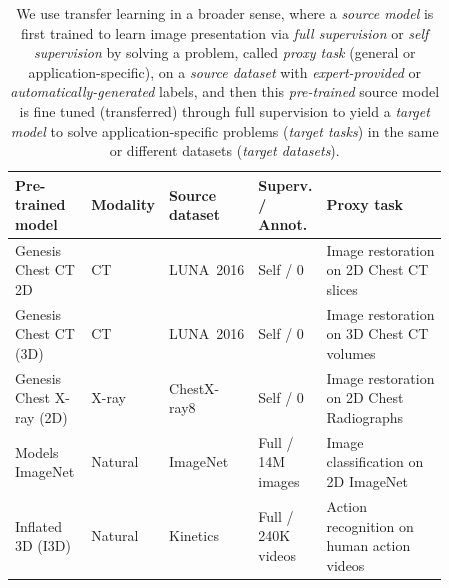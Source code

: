 
\begin{table}
\begin{threeparttable}[t]
\begin{center}
\footnotesize
\caption[Definition of Pre-trained Models, Proxy and Target Tasks]{
We use transfer learning in a broader sense, where a \textit{source model} is first trained to learn image presentation via \textit{full supervision} or \textit{self supervision} by solving a problem, called \textit{proxy task} (general or application-specific), on a \textit{source dataset} with \textit{expert-provided} or \textit{automatically-generated} labels, and then this \textit{pre-trained} source model is fine tuned (transferred) through full supervision to yield a \textit{target model} to solve application-specific problems (\textit{target tasks}) in the same or different datasets (\textit{target datasets}). 
  }
\label{ch5:tab:terminology}
    \begin{tabular}{p{0.04\linewidth}p{0.14\linewidth}p{0.07\linewidth}p{0.16\linewidth}p{0.13\linewidth}p{0.32\linewidth}}
        \hline
        \multicolumn{2}{l}{Pre-trained model} & Modality & Source dataset & Superv. / Annot. & Proxy task  \\
        \hline
        \multicolumn{2}{l}{Genesis Chest CT 2D} & CT & LUNA~2016 & Self / 0 & Image restoration on 2D Chest CT slices \\
        \multicolumn{2}{l}{Genesis Chest CT (3D)} & CT & LUNA~2016 & Self / 0 & Image restoration on 3D Chest CT volumes \\
        \multicolumn{2}{l}{Genesis Chest X-ray (2D)} & X-ray & ChestX-ray8 & Self / 0 & Image restoration on 2D Chest Radiographs \\
        \multicolumn{2}{l}{Models ImageNet} & Natural & ImageNet & Full / 14M images & Image classification on 2D ImageNet \\
        \multicolumn{2}{l}{Inflated 3D (I3D)} & Natural & Kinetics & Full / 240K videos & Action recognition on human action videos \\

\end{tabular}
\end{center}
\end{threeparttable}
\end{table}

